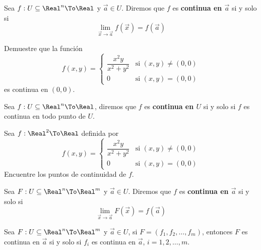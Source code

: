 
\begin{frame}{}
  \begin{defn}
    Sea $f:U\subseteq\Real^n\To\Real$ y $\vec{a}\in U$. Diremos que $f$ es \textbf{continua en $\vec{a}$} si y solo si
    $$\lim_{\vec{x}\to\vec{a}}f(\vec{x})=f(\vec{a})$$
  \end{defn}
\end{frame}

\begin{frame}
  \begin{eg}
    Demuestre que la función
    $$f(x,y)=\left\{\begin{array}{ll}
      \dfrac{x^2y}{x^2+y^2} & \text{si } (x,y)\neq(0,0)\\
      0 & \text{si } (x,y)=(0,0)
    \end{array}\right.$$
    es continua en $(0,0)$.
  \end{eg}
\end{frame}

\begin{frame}
  \begin{defn}
    Sea $f:U\subseteq\Real^n\To\Real$, diremos que $f$ es \textbf{continua en $U$} si y solo si $f$ es continua en todo punto de $U$.
  \end{defn}
\end{frame}

\begin{frame}
  \begin{eg}
    Sea $f:\Real^2\To\Real$ definida por
    $$f(x,y)=\left\{\begin{array}{ll}
      \dfrac{x^2y}{x^2+y^2} & \text{si } (x,y)\neq(0,0)\\
      0 & \text{si } (x,y)=(0,0)
    \end{array}\right.$$
    Encuentre los puntos de continuidad de $f$.
  \end{eg}
\end{frame}

\begin{frame}
  \begin{defn}
    Sea $F:U\subseteq\Real^n\To\Real^m$ y $\vec{a}\in U$. Diremos que $f$ es \textbf{continua en $\vec{a}$} si y solo si
    $$\lim_{\vec{x}\to\vec{a}}F(\vec{x})=f(\vec{a})$$
  \end{defn}
  \begin{thm}
    Sea $F:U\subseteq\Real^n\To\Real^m$ y $\vec{a}\in U$, si $F=(f_1,f_2,\ldots,f_m)$, entonces $F$ es continua en $\vec{a}$ si y solo si $f_i$ es continua en $\vec{a}$, $i=1,2,\ldots,m$.
  \end{thm}
\end{frame}

